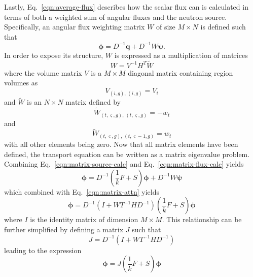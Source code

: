 Lastly, Eq.~\ref{eqn:average-flux} describes how the scalar flux can is calculated in terms of both a weighted sum of angular fluxes and the neutron source. Specifically, an angular flux weighting matrix $W$ of size $M \times N$ is defined such that
\begin{equation}
\boldsymbol{\phi} = D^{-1}\mathbf{q} + D^{-1} W \boldsymbol{\psi}.
\label{eqn:matrix-flux-calc}
\end{equation}
In order to expose its structure, $W$ is expressed as a multiplication of matrices
\begin{equation}
W = V^{-1} H^T \tilde{W}
\end{equation}
where the volume matrix $V$ is a $M \times M$ diagonal matrix containing region volumes as
\begin{equation}
V_{\left(i, g\right), \, \left(i, g\right)} = V_i
\end{equation}
and $\tilde{W}$ is an $N \times N$ matrix defined by
\begin{equation}
\tilde{W}_{\left(t,\varsigma,g\right), \, \left(t, \varsigma, g\right)} = -w_{t}
\end{equation}
and
\begin{equation}
\tilde{W}_{\left(t,\varsigma,g\right), \, \left(t, \varsigma-1, g\right)} = w_{t}
\end{equation}
with all other elements being zero. Now that all matrix elements have been defined, the transport equation can be written as a matrix eigenvalue problem. Combining Eq.~\ref{eqn:matrix-source-calc} and Eq.~\ref{eqn:matrix-flux-calc} yields
\begin{equation}
\boldsymbol{\phi} = D^{-1} \left(\frac{1}{k} F + S \right) \boldsymbol{\phi} + D^{-1} W \boldsymbol{\psi}
\end{equation}
which combined with Eq.~\ref{eqn:matrix-attn} yields
\begin{equation}
\boldsymbol{\phi} = D^{-1}\left( I + W T^{-1} H D^{-1}\right) \left(\frac{1}{k} F + S \right) \boldsymbol{\phi}
\label{eqn:moc-matrix-form}
\end{equation}
where $I$ is the identity matrix of dimension $M \times M$. This relationship can be further simplified by defining a matrix $J$ such that
\begin{equation}
J = D^{-1}\left( I + W T^{-1} H D^{-1}\right)
\end{equation}
leading to the expression
\begin{equation}
\boldsymbol{\phi} = J \left(\frac{1}{k} F + S \right) \boldsymbol{\phi}
\label{eq:transport-simplified}
\end{equation}
